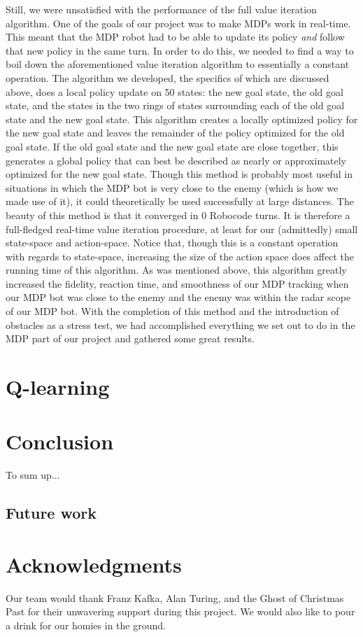 \documentclass{aiaa-tc}%
\begin{document}
Still, we were unsatisfied with the performance of the full value iteration algorithm. One of the goals of our project was to make MDPs work in real-time. This meant that the MDP robot had to be able to update its policy \emph{and} follow that new policy in the same turn. In order to do this, we needed to find a way to boil down the aforementioned  value iteration algorithm to essentially a constant operation. The algorithm we developed, the specifics of which are discussed above, does a local policy update on 50 states: the new goal state, the old goal state, and the states in the two rings of states surrounding each of the old goal state and the new goal state. This algorithm creates a locally optimized policy for the new goal state and leaves the remainder of the policy optimized for the old goal state. If the old goal state and the new goal state are close together, this generates a global policy that can best be described as nearly or approximately optimized for the new goal state. Though this method is probably most useful in situations in which the MDP bot is very close to the enemy (which is how we made use of it), it could theoretically be used successfully at large distances. The beauty of this method is that it converged in 0 Robocode turns. It is therefore a full-fledged real-time value iteration procedure, at least for our (admittedly) small state-space and action-space. Notice that, though this is a constant operation with regards to state-space, increasing the size of the action space does affect the running time of this algorithm. As was mentioned above, this algorithm greatly increased the fidelity, reaction time, and smoothness of our MDP tracking when our MDP bot was close to the enemy and the enemy was within the radar scope of our MDP bot. With the completion of this method and the introduction of obstacles as a stress test, we had accomplished everything we set out to do in the MDP part of our project and gathered some great results.

\section{Q-learning}
\label{Q-learning}


\section{Conclusion}
\label{Conclusion}
To sum up...

\subsection{Future work}

\section{Acknowledgments}
Our team would thank Franz Kafka, Alan Turing, and the Ghost of 	
Christmas Past for their unwavering support during this project. We
would also like to pour a drink for our homies in the ground.
\end{document}
